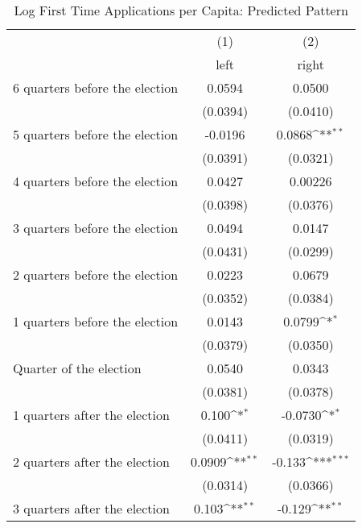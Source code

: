 \begin{table}[htbp]\centering
\def\sym#1{\ifmmode^{#1}\else\(^{#1}\)\fi}
\caption{Log First Time Applications per Capita: Predicted Pattern}
\begin{tabular}{l*{2}{c}}
\hline\hline
                    &\multicolumn{1}{c}{(1)}&\multicolumn{1}{c}{(2)}\\
                    &\multicolumn{1}{c}{left}&\multicolumn{1}{c}{right}\\
\hline
 6 quarters before the election&      0.0594         &      0.0500         \\
                    &    (0.0394)         &    (0.0410)         \\
[1em]
 5 quarters before the election&     -0.0196         &      0.0868\sym{**} \\
                    &    (0.0391)         &    (0.0321)         \\
[1em]
 4 quarters before the election&      0.0427         &     0.00226         \\
                    &    (0.0398)         &    (0.0376)         \\
[1em]
 3 quarters before the election&      0.0494         &      0.0147         \\
                    &    (0.0431)         &    (0.0299)         \\
[1em]
 2 quarters before the election&      0.0223         &      0.0679         \\
                    &    (0.0352)         &    (0.0384)         \\
[1em]
 1 quarters before the election&      0.0143         &      0.0799\sym{*}  \\
                    &    (0.0379)         &    (0.0350)         \\
[1em]
Quarter of the election&      0.0540         &      0.0343         \\
                    &    (0.0381)         &    (0.0378)         \\
[1em]
 1 quarters after the election&       0.100\sym{*}  &     -0.0730\sym{*}  \\
                    &    (0.0411)         &    (0.0319)         \\
[1em]
 2 quarters after the election&      0.0909\sym{**} &      -0.133\sym{***}\\
                    &    (0.0314)         &    (0.0366)         \\
[1em]
 3 quarters after the election&       0.103\sym{**} &      -0.129\sym{**} \\

\end{tabular}
\end{table}
